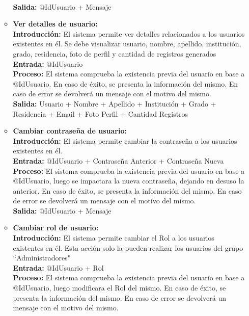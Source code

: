 \begin{enumerate}[A.]
\begin{itemize}
            \\ \textbf{Salida:} @IdUsuario + Mensaje
            \\
          \item \textbf{Ver detalles de usuario:}
            \\ \textbf{Introducción:} El sistema permite ver detalles relacionados a los usuarios existentes en él. Se debe visualizar usuario, nombre, apellido, institución, grado, residencia, foto de perfil y cantidad de registros generados
            \\ \textbf{Entrada:} @IdUsuario
            \\ \textbf{Proceso:} El sistema comprueba la existencia previa del usuario en base a @IdUsuario. En caso de éxito, se presenta la información del mismo. En caso de error se devolverá un mensaje con el motivo del mismo.
            \\ \textbf{Salida:} Usuario + Nombre + Apellido + Institución + Grado + Residencia + Email + Foto Perfil + Cantidad Registros
            \\
          \item \textbf{Cambiar contraseña de usuario:}
            \\ \textbf{Introducción:} El sistema permite cambiar la contraseña a los usuarios existentes en él.
            \\ \textbf{Entrada:} @IdUsuario + Contraseña Anterior + Contraseña Nueva
            \\ \textbf{Proceso:} El sistema comprueba la existencia previa del usuario en base a @IdUsuario, luego se impactara la nueva contraseña, dejando en desuso la anterior. En caso de éxito, se presenta la información del mismo. En caso de error se devolverá un mensaje con el motivo del mismo.
            \\ \textbf{Salida:} @IdUsuario + Mensaje
            \\
          \item \textbf{Cambiar rol de usuario:}
            \\ \textbf{Introducción:} El sistema permite cambiar el Rol a los usuarios existentes en él. Esta acción solo la pueden realizar los usuarios del grupo ``Administradores"
            \\ \textbf{Entrada:} @IdUsuario + Rol
            \\ \textbf{Proceso:} El sistema comprueba la existencia previa del usuario en base a @IdUsuario, luego modificara el Rol del mismo. En caso de éxito, se presenta la información del mismo. En caso de error se devolverá un mensaje con el motivo del mismo.

\end{itemize}
\end{enumerate}
